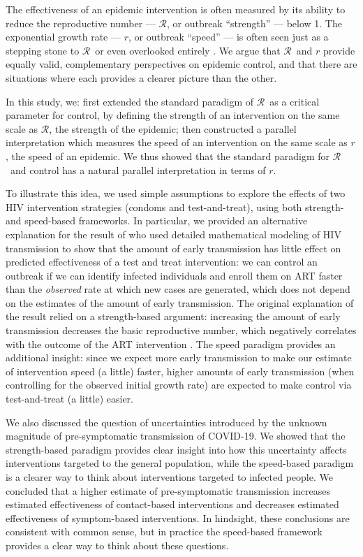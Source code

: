 \documentclass[12pt]{article}
\newcommand{\RR}{\ensuremath{{\mathcal R}}}
\begin{document}
The effectiveness of an epidemic intervention is often measured by its ability to reduce the reproductive number --- \RR, or outbreak ``strength'' --- below 1. The exponential growth rate --- $r$, or outbreak ``speed'' --- is often seen just as a stepping stone to \RR\, or even overlooked entirely \citep{park2020reconciling}.
We argue that \RR\ and $r$ provide equally valid, complementary perspectives on epidemic control, and that there are situations where each provides a clearer picture than the other.

In this study, we:
first extended the standard paradigm of \RR\ as a critical parameter for control, by defining the strength of an intervention on the same scale as \RR, the strength of the epidemic; 
then constructed a parallel interpretation which measures the speed of an intervention on the same scale as $r$, the speed of an epidemic.
We thus showed that the standard paradigm for \RR\ and control has a natural parallel interpretation in terms of $r$.

To illustrate this idea, we used simple assumptions to explore the effects of two HIV intervention strategies (condoms and test-and-treat), using both strength- and speed-based frameworks.
In particular, we provided an alternative explanation for the result of \cite{eaton2014proportion} who used detailed mathematical modeling of HIV transmission to show that the amount of early transmission has little effect on predicted effectiveness of a test and treat intervention:
we can control an outbreak if we can identify infected individuals and enroll them on ART faster than the \emph{observed} rate at which new cases are generated, which does not depend on the estimates of the amount of early transmission.
The original explanation of the result relied on a strength-based argument: increasing the amount of early transmission decreases the basic reproductive number, which negatively correlates with the outcome of the ART intervention \citep{eaton2014proportion}.
The speed paradigm provides an additional insight: since we expect more early transmission to make our estimate of intervention speed (a little) faster, higher amounts of early transmission (when controlling for the observed initial growth rate) are expected to make control via test-and-treat (a little) easier.

We also discussed the question of uncertainties introduced by the unknown magnitude of pre-symptomatic transmission of COVID-19. We showed that the strength-based paradigm provides clear insight into how this uncertainty affects interventions targeted to the general population, while the speed-based paradigm is a clearer way to think about interventions targeted to infected people. We concluded that a higher estimate of pre-symptomatic transmission increases estimated effectiveness of contact-based interventions and decreases estimated effectiveness of symptom-based interventions. In hindsight, these conclusions are consistent with common sense, but in practice the speed-based framework provides a clear way to think about these questions.
\end{document}
